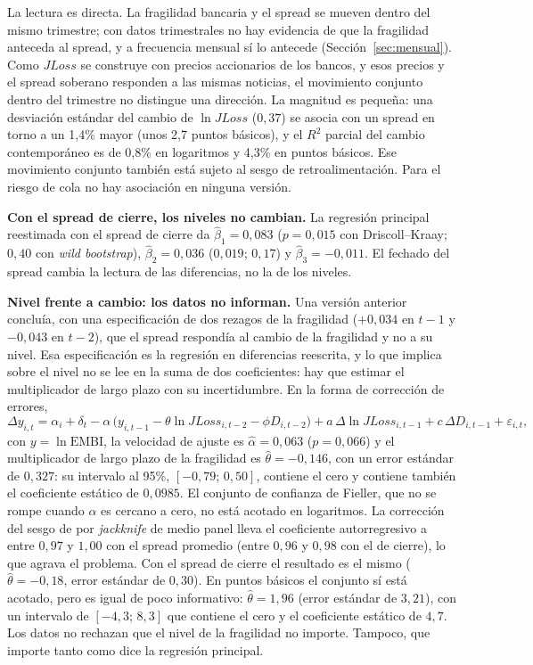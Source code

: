 La lectura es directa. La fragilidad bancaria y el spread se mueven dentro del mismo trimestre; con datos trimestrales no hay evidencia de que la fragilidad anteceda al spread, y a frecuencia mensual sí lo antecede (Sección~\ref{sec:mensual}). Como $JLoss$ se construye con precios accionarios de los bancos, y esos precios y el spread soberano responden a las mismas noticias, el movimiento conjunto dentro del trimestre no distingue una dirección. La magnitud es pequeña: una desviación estándar del cambio de $\ln JLoss$ ($0{,}37$) se asocia con un spread en torno a un 1,4\% mayor (unos 2,7 puntos básicos), y el $R^2$ parcial del cambio contemporáneo es de 0,8\% en logaritmos y 4,3\% en puntos básicos. Ese movimiento conjunto también está sujeto al sesgo de retroalimentación. Para el riesgo de cola no hay asociación en ninguna versión.

\textbf{Con el spread de cierre, los niveles no cambian.} La regresión principal reestimada con el spread de cierre da $\hat\beta_1=0{,}083$ ($p=0{,}015$ con Driscoll--Kraay; $0{,}40$ con \textit{wild bootstrap}), $\hat\beta_2=0{,}036$ ($0{,}019$; $0{,}17$) y $\hat\beta_3=-0{,}011$. El fechado del spread cambia la lectura de las diferencias, no la de los niveles.

\textbf{Nivel frente a cambio: los datos no informan.} Una versión anterior concluía, con una especificación de dos rezagos de la fragilidad ($+0{,}034$ en $t-1$ y $-0{,}043$ en $t-2$), que el spread respondía al cambio de la fragilidad y no a su nivel. Esa especificación es la regresión en diferencias reescrita, y lo que implica sobre el nivel no se lee en la suma de dos coeficientes: hay que estimar el multiplicador de largo plazo con su incertidumbre. En la forma de corrección de errores,
\begin{equation}
\Delta y_{i,t}=\alpha_i+\delta_t-\alpha\,\bigl(y_{i,t-1}-\theta\ln JLoss_{i,t-2}-\phi D_{i,t-2}\bigr)+a\,\Delta\ln JLoss_{i,t-1}+c\,\Delta D_{i,t-1}+\varepsilon_{i,t},
\label{eq:ecm}
\end{equation}
con $y=\ln\mathrm{EMBI}$, la velocidad de ajuste es $\hat\alpha=0{,}063$ ($p=0{,}066$) y el multiplicador de largo plazo de la fragilidad es $\hat\theta=-0{,}146$, con un error estándar de $0{,}327$: su intervalo al 95\%, $[-0{,}79;\,0{,}50]$, contiene el cero y contiene también el coeficiente estático de $0{,}0985$. El conjunto de confianza de Fieller, que no se rompe cuando $\alpha$ es cercano a cero, no está acotado en logaritmos. La corrección del sesgo de \citet{Nickell1981} por \textit{jackknife} de medio panel lleva el coeficiente autorregresivo a entre $0{,}97$ y $1{,}00$ con el spread promedio (entre $0{,}96$ y $0{,}98$ con el de cierre), lo que agrava el problema. Con el spread de cierre el resultado es el mismo ($\hat\theta=-0{,}18$, error estándar de $0{,}30$). En puntos básicos el conjunto sí está acotado, pero es igual de poco informativo: $\hat\theta=1{,}96$ (error estándar de $3{,}21$), con un intervalo de $[-4{,}3;\,8{,}3]$ que contiene el cero y el coeficiente estático de $4{,}7$. Los datos no rechazan que el nivel de la fragilidad no importe. Tampoco, que importe tanto como dice la regresión principal.

